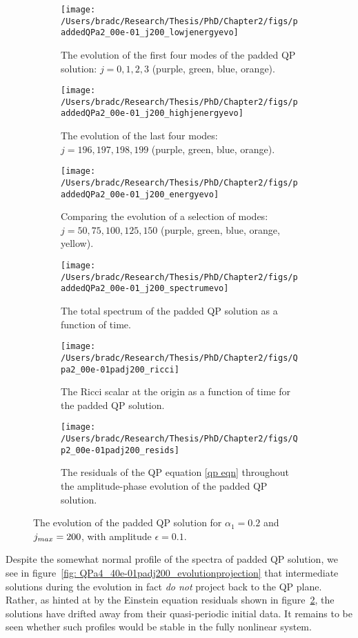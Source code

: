 \documentclass[../PhD.tex]{subfiles}
\begin{document}
\begin{figure}[h]
	\centering
	\begin{subfigure}[t]{0.45\textwidth}
		\texttt{[image: /Users/bradc/Research/Thesis/PhD/Chapter2/figs/paddedQPa2\_00e-01\_j200\_lowjenergyevo]}
		\caption{The evolution of the first four modes of the padded QP solution: $j=0,1,2,3$ (purple, green, blue, orange).}
	\end{subfigure}
	\;
	\begin{subfigure}[t]{0.45\textwidth}
		\texttt{[image: /Users/bradc/Research/Thesis/PhD/Chapter2/figs/paddedQPa2\_00e-01\_j200\_highjenergyevo]}
		\caption{The evolution of the last four modes: $j = 196, 197, 198, 199$ (purple, green, blue, orange).}
	\end{subfigure}
	\;
	\begin{subfigure}[t]{0.45\textwidth}
		\texttt{[image: /Users/bradc/Research/Thesis/PhD/Chapter2/figs/paddedQPa2\_00e-01\_j200\_energyevo]}
		\caption{Comparing the evolution of a selection of modes: $j= 50, 75, 100, 125, 150$ (purple, green, blue, orange, yellow).}
	\end{subfigure}
	\;
	\begin{subfigure}[t]{0.45\textwidth}
		\texttt{[image: /Users/bradc/Research/Thesis/PhD/Chapter2/figs/paddedQPa2\_00e-01\_j200\_spectrumevo]}
		\caption{The total spectrum of the padded QP solution as a function of time.}
		\label{fig: paddedqp_fullspecevo}
	\end{subfigure}
	\;
	\begin{subfigure}[t]{0.45\textwidth}
		\texttt{[image: /Users/bradc/Research/Thesis/PhD/Chapter2/figs/Qpa2\_00e-01padj200\_ricci]}
		\caption{The Ricci scalar at the origin as a function of time for the padded QP solution.}
	\end{subfigure}
	\;
	\begin{subfigure}[t]{0.45\textwidth}
		\texttt{[image: /Users/bradc/Research/Thesis/PhD/Chapter2/figs/Qp2\_00e-01padj200\_resids]}
		\caption{The residuals of the QP equation \eqref{qp eqn} throughout the amplitude-phase evolution of the padded QP solution.}
		\label{fig: Qp2_00e-01padj200_resids}
	\end{subfigure}
	\caption{The evolution of the padded QP solution for $\alpha_1 =0.2$ and $j_{max} = 200$, with amplitude $\epsilon=0.1$.}
	\label{fig:paddedqpevo}
\end{figure}

Despite the somewhat normal profile of the spectra of padded QP solution, we see in figure~\ref{fig: QPa4_40e-01padj200_evolutionprojection} that intermediate solutions during the evolution in fact \emph{do not} project back to the QP plane. Rather, as hinted at by the Einstein equation residuals shown in figure~\ref{fig: Qp2_00e-01padj200_resids}, the solutions have drifted away from their quasi-periodic initial data. It remains to be seen whether such profiles would be stable in the fully nonlinear system.
\end{document}
